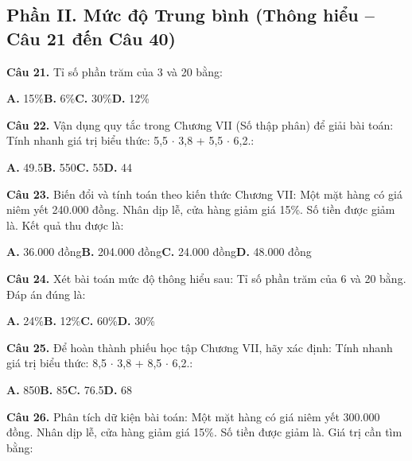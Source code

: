 \documentclass[11pt,a4paper]{article}
\begin{document}
\subsection*{\color{accent} Phần II. Mức độ Trung bình (Thông hiểu -- Câu 21 đến Câu 40)}
\textbf{\color{primary} Câu 21.} Tỉ số phần trăm của 3 và 20 bằng:\par
\hspace*{1.5em}\textbf{A.} 15\%\quad\quad \textbf{B.} 6\%\quad\quad \textbf{C.} 30\%\quad\quad \textbf{D.} 12\%\par\vspace{2pt}
\textbf{\color{primary} Câu 22.} Vận dụng quy tắc trong Chương VII (Số thập phân) để giải bài toán: Tính nhanh giá trị biểu thức: 5,5 $\cdot$ 3,8 + 5,5 $\cdot$ 6,2.:\par
\hspace*{1.5em}\textbf{A.} 49.5\quad\quad \textbf{B.} 550\quad\quad \textbf{C.} 55\quad\quad \textbf{D.} 44\par\vspace{2pt}
\textbf{\color{primary} Câu 23.} Biến đổi và tính toán theo kiến thức Chương VII: Một mặt hàng có giá niêm yết 240.000 đồng. Nhân dịp lễ, cửa hàng giảm giá 15\%. Số tiền được giảm là. Kết quả thu được là:\par
\hspace*{1.5em}\textbf{A.} 36.000 đồng\quad\quad \textbf{B.} 204.000 đồng\quad\quad \textbf{C.} 24.000 đồng\quad\quad \textbf{D.} 48.000 đồng\par\vspace{2pt}
\textbf{\color{primary} Câu 24.} Xét bài toán mức độ thông hiểu sau: Tỉ số phần trăm của 6 và 20 bằng. Đáp án đúng là:\par
\hspace*{1.5em}\textbf{A.} 24\%\quad\quad \textbf{B.} 12\%\quad\quad \textbf{C.} 60\%\quad\quad \textbf{D.} 30\%\par\vspace{2pt}
\textbf{\color{primary} Câu 25.} Để hoàn thành phiếu học tập Chương VII, hãy xác định: Tính nhanh giá trị biểu thức: 8,5 $\cdot$ 3,8 + 8,5 $\cdot$ 6,2.:\par
\hspace*{1.5em}\textbf{A.} 850\quad\quad \textbf{B.} 85\quad\quad \textbf{C.} 76.5\quad\quad \textbf{D.} 68\par\vspace{2pt}
\textbf{\color{primary} Câu 26.} Phân tích dữ kiện bài toán: Một mặt hàng có giá niêm yết 300.000 đồng. Nhân dịp lễ, cửa hàng giảm giá 15\%. Số tiền được giảm là. Giá trị cần tìm bằng:\par
\end{document}
